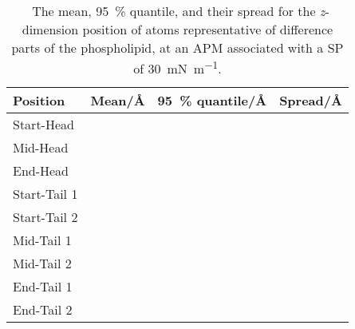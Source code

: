 %
\begin{table}[b]
\forceversofloat
\centering
\small
  \caption{\ The mean, \SI{95}{\percent} quantile, and their spread for the \emph{z}-dimension position of atoms representative of difference parts of the phospholipid, at an APM associated with a SP of \SI{30}{\milli\newton\per\meter}.}
  \label{tab:spread2}
  \begin{tabular}{llll}
    \toprule
    Position & Mean/\si{\angstrom} & \SI{95}{\percent} quantile/\si{\angstrom} & Spread/\si{\angstrom} \\
    \midrule
    Start-Head &  &  &  \\
    Mid-Head &  &  &  \\
    End-Head &  &  &  \\
    \midrule
    Start-Tail 1 &  &  &  \\
    Start-Tail 2 &  &  &  \\
    Mid-Tail 1 &  &  &  \\
    Mid-Tail 2 &  &  &  \\
    End-Tail 1 &  &  &  \\
    End-Tail 2 &  &  &  \\
    \bottomrule
  \end{tabular}
\end{table}
